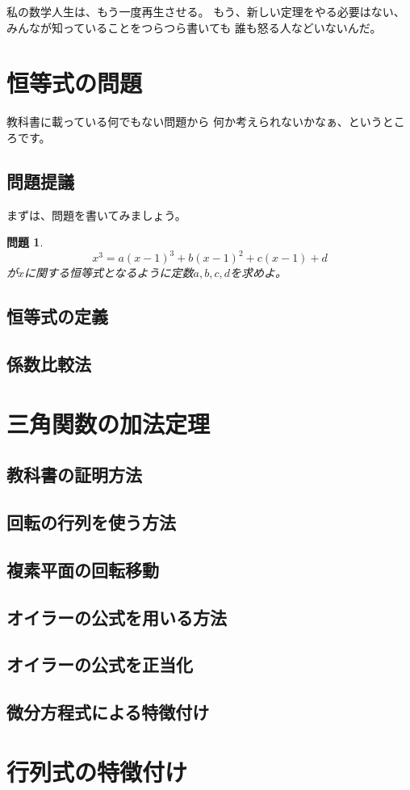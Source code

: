 \documentclass[fleqn]{jsarticle}
\newtheorem{problem}{問題}
\begin{document}
私の数学人生は、もう一度再生させる。
もう、新しい定理をやる必要はない、
みんなが知っていることをつらつら書いても
誰も怒る人などいないんだ。



\section[恒等式]{恒等式の問題}

教科書に載っている何でもない問題から
何か考えられないかなぁ、というところです。

\subsection[問題]{問題提議}

まずは、問題を書いてみましょう。

\begin{problem}
\begin{equation}\label{eq:idmon}
x^3=a(x-1)^3+b(x-1)^2+c(x-1)+d
\end{equation}
が$x$に関する恒等式となるように定数$a,b,c,d$を求めよ。
\end{problem}

\subsection[定義]{恒等式の定義}

\subsection[係数比較]{係数比較法}


\section[加法定理]{三角関数の加法定理}

\subsection[教科書の方法]{教科書の証明方法}

\subsection[回転の行列]{回転の行列を使う方法}

\subsection[複素平面]{複素平面の回転移動}

\subsection[オイラーの公式]{オイラーの公式を用いる方法}

\subsection[テイラー級数]{オイラーの公式を正当化}

\subsection[微分方程式]{微分方程式による特徴付け}


\section[行列式の特徴付け]{行列式の特徴付け}
\end{document}
